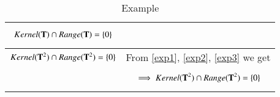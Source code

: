 \documentclass[journal,12pt]{IEEEtran}
\begin{document}
\begin{longtable}{|l|l|}
{\begin{align}
    Kernel(\mathbf{T})\cap Range(\mathbf{T})=\left\{0\right\}\label{exp3}
\end{align}}\\
\hline
$Kernel(\mathbf{T}^2)\cap Range(\mathbf{T}^2)=\left\{0\right\}$&From \eqref{exp1}, \eqref{exp2}, \eqref{exp3} we get\\&\parbox{11cm}{\begin{align}
    \implies Kernel(\mathbf{T}^2)\cap Range(\mathbf{T}^2)=\left\{0\right\}
\end{align}}\\
\hline
\caption{Example}
\label{exp}
\end{longtable}
\end{document}

